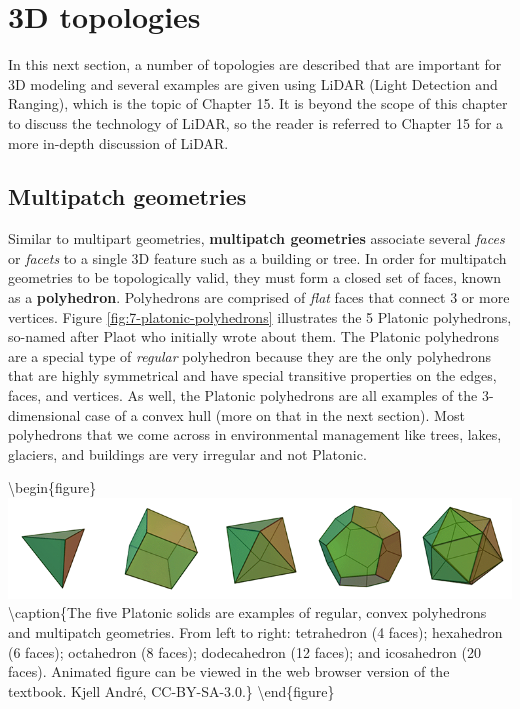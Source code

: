 \documentclass[
]{book}
\begin{document}
\hypertarget{d-topologies}{%
\section{3D topologies}\label{d-topologies}}

In this next section, a number of topologies are described that are important for 3D modeling and several examples are given using LiDAR (Light Detection and Ranging), which is the topic of Chapter 15. It is beyond the scope of this chapter to discuss the technology of LiDAR, so the reader is referred to Chapter 15 for a more in-depth discussion of LiDAR.

\hypertarget{multipatch-geometries-1}{%
\subsection{Multipatch geometries}\label{multipatch-geometries-1}}

Similar to multipart geometries, \textbf{multipatch geometries} associate several \emph{faces} or \emph{facets} to a single 3D feature such as a building or tree. In order for multipatch geometries to be topologically valid, they must form a closed set of faces, known as a \textbf{polyhedron}. Polyhedrons are comprised of \emph{flat} faces that connect 3 or more vertices. Figure \ref{fig:7-platonic-polyhedrons} illustrates the 5 Platonic polyhedrons, so-named after Plaot who initially wrote about them. The Platonic polyhedrons are a special type of \emph{regular} polyhedron because they are the only polyhedrons that are highly symmetrical and have special transitive properties on the edges, faces, and vertices. As well, the Platonic polyhedrons are all examples of the 3-dimensional case of a convex hull (more on that in the next section). Most polyhedrons that we come across in environmental management like trees, lakes, glaciers, and buildings are very irregular and not Platonic.

\textbackslash begin\{figure\}
\includegraphics[width=0.75\linewidth]{images/07-platonic-polyhedrons} \textbackslash caption\{The five Platonic solids are examples of regular, convex polyhedrons and multipatch geometries. From left to right: tetrahedron (4 faces); hexahedron (6 faces); octahedron (8 faces); dodecahedron (12 faces); and icosahedron (20 faces). Animated figure can be viewed in the web browser version of the textbook. Kjell André, CC-BY-SA-3.0.\}\label{fig:7-platonic-polyhedrons}
\textbackslash end\{figure\}
\end{document}
